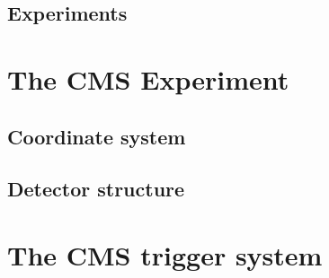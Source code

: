 
\subsection{Experiments}

\section{The CMS Experiment}
\subsection{Coordinate system}
\subsection{Detector structure}

\section{The CMS trigger system}
